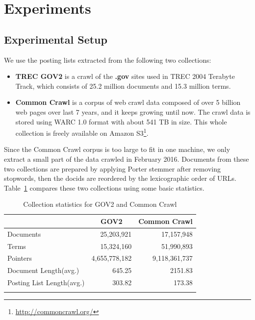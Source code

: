 \documentclass[runningheads,a4paper]{llncs}
\begin{document}
\section{Experiments}\label{sec:experiments}

\subsection{Experimental Setup}

We use the posting lists extracted from the following two collections:
\begin{itemize}
	\item \textbf{TREC GOV2} is a crawl of the \textbf{.gov} sites used in TREC 2004 Terabyte Track, which consists of 25.2 million documents and 15.3 million terms.
	\item \textbf{Common Crawl} is a corpus of web crawl data composed of over 5 billion web pages over last 7 years, and it keeps growing until now.
	The crawl data is stored using WARC 1.0 format with about 541 TB in size.
	This whole collection is freely available on Amazon S3\footnote{\url{http://commoncrawl.org/}}. 
\end{itemize}

Since the Common Crawl corpus is too large to fit in one machine, we only extract a small part of the data crawled in February 2016.
Documents from these two collections are prepared by applying Porter stemmer after removing stopwords, then the docids are reordered by the lexicographic order of URLs.
Table~\ref{tab: collection statistics} compares these two collections using some basic statistics.

\begin{table}
	\centering
	\caption{Collection statistics for GOV2 and Common Crawl}
	\renewcommand{\arraystretch}{1.0}
	\begin{tabular}{l*{2}{r}}
		\toprule
		& \multicolumn{1}{c}{GOV2} & \multicolumn{1}{c}{Common Crawl} \\
		\midrule
		Documents & 25,203,921 & 17,157,948 \\
		Terms  & 15,324,160 & 51,990,893 \\
		Pointers & 4,655,778,182 & 9,118,361,737 \\
		Document Length(avg.) & 645.25 & 2151.83 \\
		Posting List Length(avg.) & 303.82 & 173.38 \\
		\bottomrule
		\label{tab: collection statistics}
	\end{tabular}
\end{table}
\end{document}
